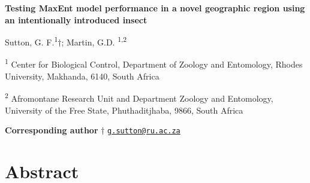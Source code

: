 \documentclass[12pt,]{article}
\author{}
\date{}
\begin{document}
	
%    





\vskip -8.5pt



\noindent \doublespacing 

\pagebreak

\setlength{\parindent}{0in}
\setlength{\leftskip}{0in}
\setlength{\parskip}{8pt}
\vspace*{-0.2in}

\noindent

\textbf{Testing MaxEnt model performance in a novel geographic region
using an intentionally introduced insect}

Sutton, G. F.\textsuperscript{1}\(\dag\); Martin, G.D.
\textsuperscript{1,2}

\hfill\break

\begingroup
\fontsize{10}{12}\selectfont

\textsuperscript{1} Center for Biological Control, Department of Zoology
and Entomology, Rhodes University, Makhanda, 6140, South Africa

\textsuperscript{2} Afromontane Research Unit and Department Zoology and
Entomology, University of the Free State, Phuthaditjhaba, 9866, South
Africa \endgroup

\hfill\break

\textbf{Corresponding author} \(\dag\)
\href{mailto:g.sutton@ru.ac.za}{\nolinkurl{g.sutton@ru.ac.za}}

\pagebreak

\setlength\parindent{24pt}

\hypertarget{abstract}{%
\section{Abstract}\label{abstract}}
\end{document}
